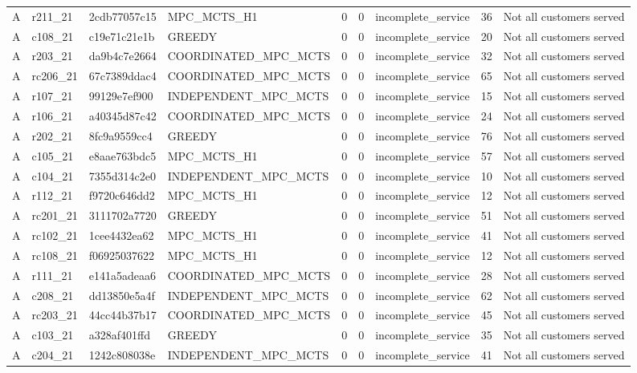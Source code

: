 \begin{table}
{\begin{tabular}{llllrrlrl}
A & r211\_21 & 2cdb77057c15 & MPC\_MCTS\_H1 & 0 & 0 & incomplete\_service & 36 & Not all customers served \\
A & c108\_21 & c19e71c21e1b & GREEDY & 0 & 0 & incomplete\_service & 20 & Not all customers served \\
A & r203\_21 & da9b4c7e2664 & COORDINATED\_MPC\_MCTS & 0 & 0 & incomplete\_service & 32 & Not all customers served \\
A & rc206\_21 & 67c7389ddac4 & COORDINATED\_MPC\_MCTS & 0 & 0 & incomplete\_service & 65 & Not all customers served \\
A & r107\_21 & 99129e7ef900 & INDEPENDENT\_MPC\_MCTS & 0 & 0 & incomplete\_service & 15 & Not all customers served \\
A & r106\_21 & a40345d87c42 & COORDINATED\_MPC\_MCTS & 0 & 0 & incomplete\_service & 24 & Not all customers served \\
A & r202\_21 & 8fc9a9559cc4 & GREEDY & 0 & 0 & incomplete\_service & 76 & Not all customers served \\
A & c105\_21 & e8aae763bdc5 & MPC\_MCTS\_H1 & 0 & 0 & incomplete\_service & 57 & Not all customers served \\
A & c104\_21 & 7355d314c2e0 & INDEPENDENT\_MPC\_MCTS & 0 & 0 & incomplete\_service & 10 & Not all customers served \\
A & r112\_21 & f9720c646dd2 & MPC\_MCTS\_H1 & 0 & 0 & incomplete\_service & 12 & Not all customers served \\
A & rc201\_21 & 3111702a7720 & GREEDY & 0 & 0 & incomplete\_service & 51 & Not all customers served \\
A & rc102\_21 & 1cee4432ea62 & MPC\_MCTS\_H1 & 0 & 0 & incomplete\_service & 41 & Not all customers served \\
A & rc108\_21 & f06925037622 & MPC\_MCTS\_H1 & 0 & 0 & incomplete\_service & 12 & Not all customers served \\
A & r111\_21 & e141a5adeaa6 & COORDINATED\_MPC\_MCTS & 0 & 0 & incomplete\_service & 28 & Not all customers served \\
A & c208\_21 & dd13850e5a4f & INDEPENDENT\_MPC\_MCTS & 0 & 0 & incomplete\_service & 62 & Not all customers served \\
A & rc203\_21 & 44cc44b37b17 & COORDINATED\_MPC\_MCTS & 0 & 0 & incomplete\_service & 45 & Not all customers served \\
A & c103\_21 & a328af401ffd & GREEDY & 0 & 0 & incomplete\_service & 35 & Not all customers served \\
A & c204\_21 & 1242c808038e & INDEPENDENT\_MPC\_MCTS & 0 & 0 & incomplete\_service & 41 & Not all customers served \\

\end{tabular}}
\end{table}
